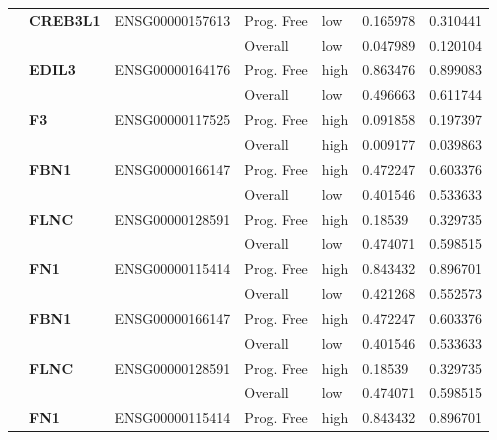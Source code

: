 \begin{spacing}{1}
{\begin{longtable}{%
            |>{\bfseries}p{2cm}|
            >{\bfseries}p{1.9cm}|
            >{\tiny}p{1.9cm}|
            p{2cm}|
            p{2cm}|
            p{1.5cm}|
            p{1.5cm}|
            }
            \hhline{~======}
             & CREB3L1  & ENSG00000157613 & Prog. Free & low  & 0.165978 & 0.310441 \\
            \hhline{~~~----}
             &          &                 & Overall    & low  & 0.047989 & 0.120104 \\
            \hhline{~======}
             & EDIL3    & ENSG00000164176 & Prog. Free & high & 0.863476 & 0.899083 \\
            \hhline{~~~----}
             &          &                 & Overall    & low  & 0.496663 & 0.611744 \\
            \hhline{~======}
             & F3       & ENSG00000117525 & Prog. Free & high & 0.091858 & 0.197397 \\
            \hhline{~~~----}
             &          &                 & Overall    & high & 0.009177 & 0.039863 \\
            \hhline{~======}
             & FBN1     & ENSG00000166147 & Prog. Free & high & 0.472247 & 0.603376 \\
            \hhline{~~~----}
             &          &                 & Overall    & low  & 0.401546 & 0.533633 \\
            \hhline{~======}
             & FLNC     & ENSG00000128591 & Prog. Free & high & 0.18539  & 0.329735 \\
            \hhline{~~~----}
             &          &                 & Overall    & low  & 0.474071 & 0.598515 \\
            \hhline{~======}
             & FN1      & ENSG00000115414 & Prog. Free & high & 0.843432 & 0.896701 \\
            \hhline{~~~----}
             &          &                 & Overall    & low  & 0.421268 & 0.552573 \\
            \hhline{~======}
             & FBN1     & ENSG00000166147 & Prog. Free & high & 0.472247 & 0.603376 \\
            \hhline{~~~----}
             &          &                 & Overall    & low  & 0.401546 & 0.533633 \\
            \hhline{~======}
             & FLNC     & ENSG00000128591 & Prog. Free & high & 0.18539  & 0.329735 \\
            \hhline{~~~----}
             &          &                 & Overall    & low  & 0.474071 & 0.598515 \\
            \hhline{~======}
             & FN1      & ENSG00000115414 & Prog. Free & high & 0.843432 & 0.896701 \\

\end{longtable}}
\end{spacing}
